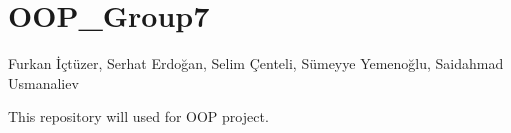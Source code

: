 \chapter{OOP\+\_\+\+Group7}
\hypertarget{md__r_e_a_d_m_e}{}\label{md__r_e_a_d_m_e}
\label{md__r_e_a_d_m_e_autotoc_md0}%
%


Furkan İçtüzer, Serhat Erdoğan, Selim Çenteli, Sümeyye Yemenoğlu, Saidahmad Usmanaliev

This repository will used for OOP project. 